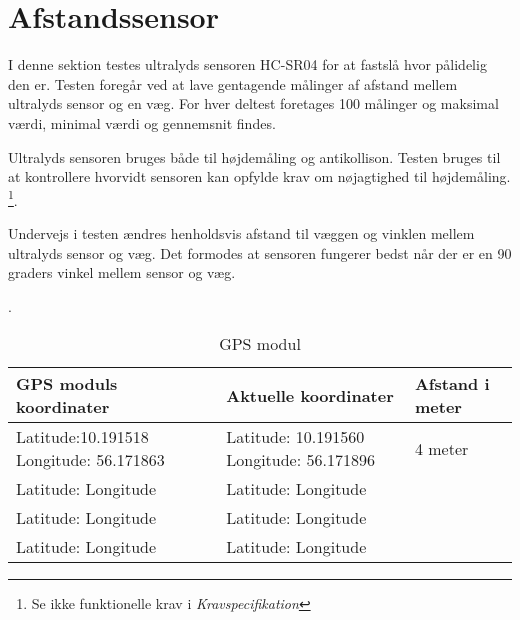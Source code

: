 \section{Afstandssensor}

I denne sektion testes ultralyds sensoren HC-SR04 for at fastslå hvor pålidelig den er. 
Testen foregår ved at lave gentagende målinger af afstand mellem ultralyds sensor og en væg.
For hver deltest foretages 100 målinger og maksimal værdi, minimal værdi og gennemsnit findes. 

Ultralyds sensoren bruges både til højdemåling og antikollison. Testen bruges til at kontrollere hvorvidt sensoren kan opfylde krav om nøjagtighed til højdemåling. \footnote{Se ikke funktionelle krav i \textit{Kravspecifikation}}. 

Undervejs i testen ændres henholdsvis afstand til væggen og vinklen mellem ultralyds sensor og væg. Det formodes at sensoren fungerer bedst når der er en 90 graders vinkel mellem sensor og væg. 




  . 
 


\begin{table}[H]
\begin{tabular}{| p{4cm}| p{4cm}| p{3cm}|}
\hline
GPS moduls koordinater & Aktuelle koordinater & Afstand i meter\\\hline
Latitude:10.191518 \newline Longitude: 56.171863 & Latitude: 10.191560 \newline Longitude: 56.171896 & 4 meter\\\hline
Latitude: \newline Longitude & Latitude: \newline Longitude & \\\hline
Latitude: \newline Longitude & Latitude: \newline Longitude & \\\hline
Latitude: \newline Longitude & Latitude: \newline Longitude & \\\hline

\end{tabular}
\caption{GPS modul}
\label{tab:GPS_modul}
\end{table}


